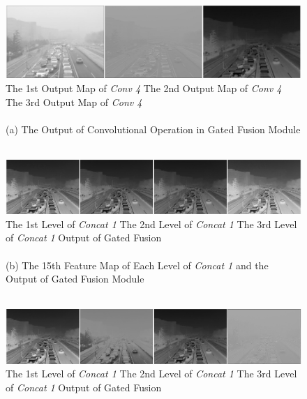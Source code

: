 \documentclass[lettersize,journal]{IEEEtran}
\begin{document}
\begin{figure}[pht]
    \centering
    \includegraphics[width=\textwidth]{visual.jpg}
    The 1st Output Map of \textit{Conv 4} \qquad\qquad The 2nd Output Map of \textit{Conv 4} \qquad\qquad The 3rd Output Map of \textit{Conv 4} \\

    \quad \\
    
    (a) The Output of Convolutional Operation in Gated Fusion Module

    \quad \\

    \includegraphics[width=\textwidth]{res15.jpg}
    The 1st Level of \textit{Concat 1} \quad The 2nd Level of \textit{Concat 1} \quad The 3rd Level of \textit{Concat 1} \quad\;\;\; Output of Gated Fusion\\

    \quad \\
    
    (b) The 15th Feature Map of Each Level of \textit{Concat 1} and the Output of Gated Fusion Module

    \quad \\
    
    \includegraphics[width=\textwidth]{res30.jpg}
    The 1st Level of \textit{Concat 1} \quad The 2nd Level of \textit{Concat 1} \quad The 3rd Level of \textit{Concat 1} \quad\;\;\; Output of Gated Fusion\\


\end{figure}
\end{document}
